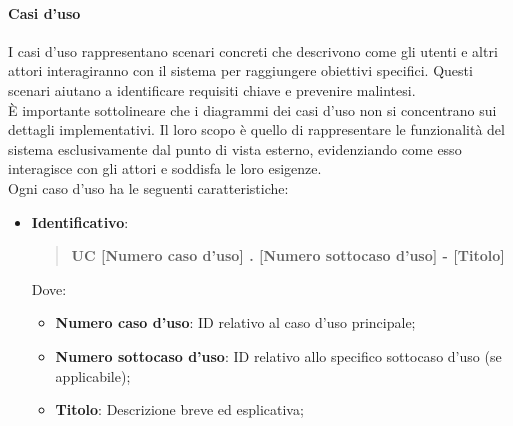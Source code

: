 \documentclass[10pt]{article}
\begin{document}
\begin{justify}
        \paragraph{Casi d'uso}
        I casi d’uso rappresentano scenari concreti che descrivono come gli utenti e altri attori interagiranno con il sistema per raggiungere obiettivi specifici. Questi scenari aiutano a identificare requisiti chiave e prevenire malintesi.\\
        È importante sottolineare che i diagrammi dei casi d’uso non si concentrano sui dettagli implementativi. Il loro scopo è quello di rappresentare le funzionalità del sistema esclusivamente dal punto di vista esterno, evidenziando come esso interagisce con gli attori e soddisfa le loro esigenze.\\
        Ogni caso d'uso ha le seguenti caratteristiche:
        \begin{itemize}
            \item \textbf{Identificativo}:
            \begin{quote}
                \textbf{UC [Numero caso d’uso] . [Numero sottocaso d’uso] - [Titolo]}
            \end{quote}
            Dove:
            \begin{itemize}
                \item \textbf{Numero caso d’uso}: ID relativo al caso d'uso principale;
                \item \textbf{Numero sottocaso d’uso}: ID relativo allo specifico sottocaso d'uso (se applicabile);
                \item \textbf{Titolo}: Descrizione breve ed esplicativa;
            \end{itemize}


\end{itemize}
\end{justify}
\end{document}
